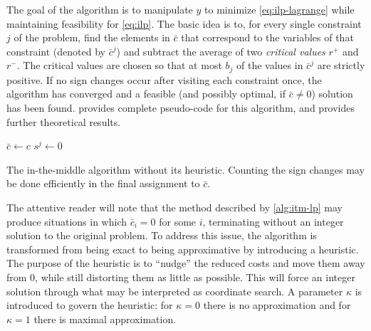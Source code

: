 The goal of the algorithm is to manipulate \(y\) to minimize \eqref{eq:ilp-lagrange} while maintaining feasibility for \eqref{eq:ilp}.
The basic idea is to, for every single constraint \(j\) of the problem, find the elements in \(\bar{c}\) that correspond to the variables of that constraint (denoted by \(\bar{c}^j\)) and subtract the average of two \emph{critical values} \(r^+\) and \(r^-\).
The critical values are chosen so that at most \(b_j\) of the values in \(\bar{c}^j\) are strictly positive.
If no sign changes occur after visiting each constraint once, the algorithm has converged and a feasible (and possibly optimal, if \(\bar{c} \neq 0\)) solution has been found.
 provides complete pseudo-code for this algorithm, and \textcites{Wedelin95}{Wedelin13} provides further theoretical results.

\begin{algorithm}[tp]
	\(\bar{c} \leftarrow c\) \;
	\(s^j \leftarrow 0\) \;

	\caption{
		The in-the-middle algorithm without its heuristic.
		Counting the sign changes may be done efficiently in the final assignment to \(\bar{c}\).
	}
	\label{alg:itm-lp}
\end{algorithm}

The attentive reader will note that the method described by \cref{alg:itm-lp} may produce situations in which \(\bar{c}_i = 0\) for some \(i\), terminating without an integer solution to the original problem.
To address this issue, the algorithm is transformed from being exact to being approximative by introducing a heuristic.
The purpose of the heuristic is to \enquote{nudge} the reduced costs and move them away from \(0\), while still distorting them as little as possible.
This will force an integer solution through what may be interpreted as coordinate search.
A parameter \(\kappa\) is introduced to govern the heuristic: for \(\kappa=0\) there is no approximation and for \(\kappa=1\) there is maximal approximation.

